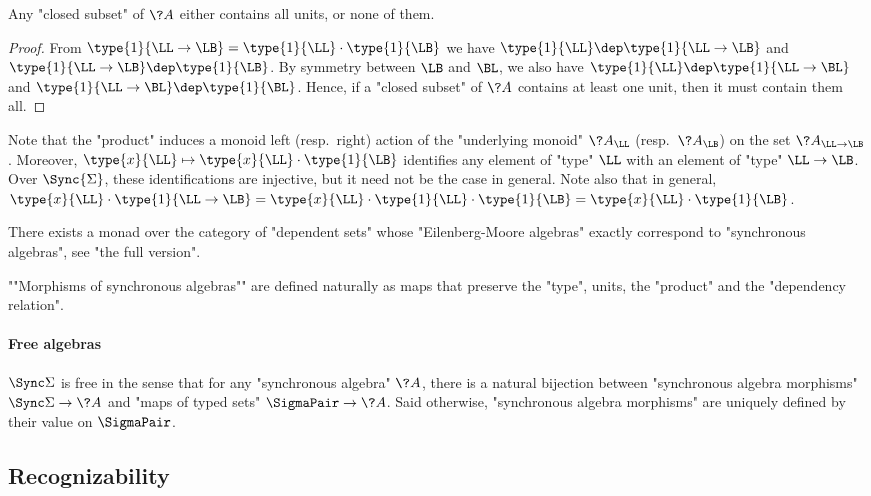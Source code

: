 \begin{fact}
	\label{fact:closed-subset-units}
	Any "closed subset" of $\?A$ either contains all units, or none of them.
\end{fact}

\begin{proof}
	From $\type{1}{\LL \to \LB} = \type{1}{\LL}\cdot \type{1}{\LB}$ we have
	$\type{1}{\LL} \dep \type{1}{\LL \to \LB}$
	and $\type{1}{\LL \to \LB} \dep \type{1}{\LB}$.
	By symmetry between $\LB$ and $\BL$, we also have
	$\type{1}{\LL} \dep \type{1}{\LL\to\BL}$ and $\type{1}{\LL\to\BL} \dep \type{1}{\BL}$.
	Hence, if a "closed subset" of $\?A$ contains at least one unit, then it must contain them all.
\end{proof}

Note that the "product" induces a monoid left (resp.~right) action of the
"underlying monoid" $\?A_{\LL}$ (resp.~$\?A_{\LB}$) on the set $\?A_{\LL\to\LB}$.
Moreover, $\type{x}{\LL} \mapsto \type{x}{\LL} \cdot \type{1}{\LB}$
identifies any element of "type" $\LL$ with an element of "type" $\LL\to\LB$.
Over $\Sync{\Sigma}$, these identifications are injective, but it need not be the
case in general. Note also that in general,
$\type{x}{\LL} \cdot \type{1}{\LL\to\LB} = \type{x}{\LL} \cdot \type{1}{\LL}
\cdot \type{1}{\LB} = \type{x}{\LL} \cdot \type{1}{\LB}$.

\begin{remark}
	There exists a monad over the category of "dependent sets" whose
	"Eilenberg-Moore algebras" exactly correspond to
	"synchronous algebras", see "the full version".
\end{remark}

\AP""Morphisms of synchronous algebras"" are defined naturally as
maps that preserve the "type", units, the "product" and the "dependency relation".

\paragraph*{Free algebras}
$\Sync\Sigma$ is free in the sense that
for any "synchronous algebra" $\?A$, there is a natural bijection between
"synchronous algebra morphisms" $\Sync\Sigma \to \?A$
and "maps of typed sets" $\SigmaPair \to \?A$.
Said otherwise, "synchronous algebra morphisms" are uniquely defined by
their value on $\SigmaPair$.

\subsection{Recognizability}

